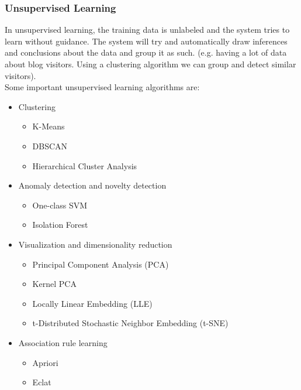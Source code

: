 \documentclass[12pt]{article}
\begin{document}
    \subsubsection{Unsupervised Learning}
        In unsupervised learning, the training data is unlabeled and the system tries to learn without guidance. The
        system will try and automatically draw inferences and conclusions about the data and group it as such. (e.g.
        having a lot of data about blog visitors. Using a clustering algorithm we can group and detect similar
        visitors). \\[0.1in]
        Some important unsupervised learning algorithms are:
        \begin{itemize}
            \item Clustering
            \begin{itemize}
                \item K-Means
                \item DBSCAN
                \item Hierarchical Cluster Analysis
            \end{itemize}
            \item Anomaly detection and novelty detection
            \begin{itemize}
                \item One-class SVM
                \item Isolation Forest
            \end{itemize}
            \item Visualization and dimensionality reduction
            \begin{itemize}
                \item Principal Component Analysis (PCA)
                \item Kernel PCA
                \item Locally Linear Embedding (LLE)
                \item t-Distributed Stochastic Neighbor Embedding (t-SNE)
            \end{itemize}
            \item Association rule learning
            \begin{itemize}
                \item Apriori
                \item Eclat
            \end{itemize}
        \end{itemize}
\end{document}
